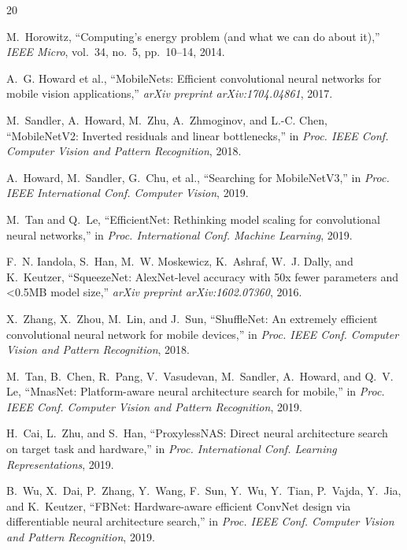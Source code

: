 \documentclass{svproc}
\begin{document}
\begin{thebibliography}{20}

M.~Horowitz, ``Computing's energy problem (and what we can do about it),''
\emph{IEEE Micro}, vol.~34, no.~5, pp.~10--14, 2014.

A.~G. Howard et al., ``MobileNets: Efficient convolutional neural networks for
mobile vision applications,'' \emph{arXiv preprint arXiv:1704.04861}, 2017.

M.~Sandler, A.~Howard, M.~Zhu, A.~Zhmoginov, and L.-C. Chen,
``MobileNetV2: Inverted residuals and linear bottlenecks,'' in
\emph{Proc. IEEE Conf. Computer Vision and Pattern Recognition}, 2018.

A.~Howard, M.~Sandler, G.~Chu, et al., ``Searching for MobileNetV3,'' in
\emph{Proc. IEEE International Conf. Computer Vision}, 2019.

M.~Tan and Q.~Le, ``EfficientNet: Rethinking model scaling for convolutional
neural networks,'' in \emph{Proc. International Conf. Machine Learning}, 2019.

F.~N. Iandola, S.~Han, M.~W. Moskewicz, K.~Ashraf, W.~J. Dally, and
K.~Keutzer, ``SqueezeNet: AlexNet-level accuracy with 50x fewer parameters and
<0.5MB model size,'' \emph{arXiv preprint arXiv:1602.07360}, 2016.

X.~Zhang, X.~Zhou, M.~Lin, and J.~Sun, ``ShuffleNet: An extremely efficient
convolutional neural network for mobile devices,'' in \emph{Proc. IEEE Conf.
Computer Vision and Pattern Recognition}, 2018.

M.~Tan, B.~Chen, R.~Pang, V.~Vasudevan, M.~Sandler, A.~Howard, and Q.~V. Le,
``MnasNet: Platform-aware neural architecture search for mobile,'' in
\emph{Proc. IEEE Conf. Computer Vision and Pattern Recognition}, 2019.

H.~Cai, L.~Zhu, and S.~Han, ``ProxylessNAS: Direct neural architecture search
on target task and hardware,'' in \emph{Proc. International Conf. Learning
Representations}, 2019.

B.~Wu, X.~Dai, P.~Zhang, Y.~Wang, F.~Sun, Y.~Wu, Y.~Tian, P.~Vajda, Y.~Jia,
and K.~Keutzer, ``FBNet: Hardware-aware efficient ConvNet design via
differentiable neural architecture search,'' in \emph{Proc. IEEE Conf.
Computer Vision and Pattern Recognition}, 2019.


\end{thebibliography}
\end{document}
